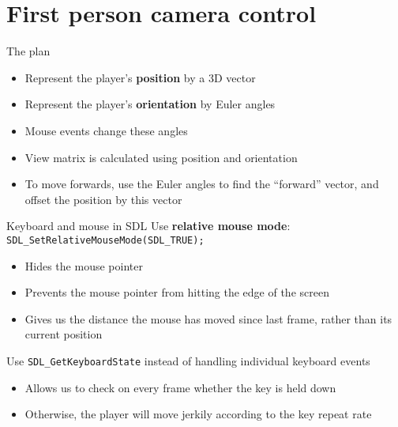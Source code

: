 \part{First person camera control}
\frame{\partpage}

\begin{frame}{The plan}
	\begin{itemize}
		\pause\item Represent the player's \textbf{position} by a 3D vector
		\pause\item Represent the player's \textbf{orientation} by Euler angles
		\pause\item Mouse events change these angles
		\pause\item View matrix is calculated using position and orientation
		\pause\item To move forwards, use the Euler angles to find the ``forward'' vector,
			and offset the position by this vector
	\end{itemize}
\end{frame}

\begin{frame}{Keyboard and mouse in SDL}
	\pause Use \textbf{relative mouse mode}: \lstinline{SDL_SetRelativeMouseMode(SDL_TRUE);}
	\begin{itemize}
		\pause\item Hides the mouse pointer
		\pause\item Prevents the mouse pointer from hitting the edge of the screen
		\pause\item Gives us the distance the mouse has moved since last frame, rather than its current position
	\end{itemize}
	\pause Use \lstinline{SDL_GetKeyboardState} instead of handling individual keyboard events
	\begin{itemize}
		\pause\item Allows us to check on every frame whether the key is held down
		\pause\item Otherwise, the player will move jerkily according to the key repeat rate
	\end{itemize}
\end{frame}

